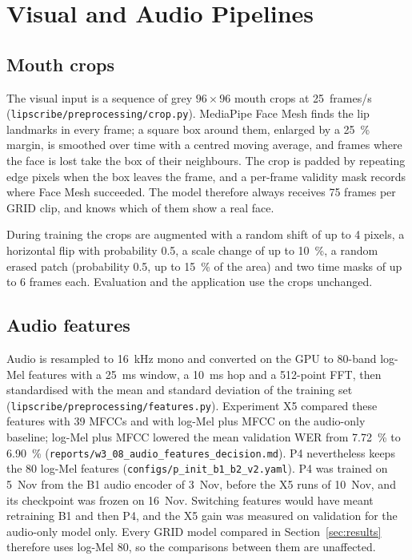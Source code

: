 \section{Visual and Audio Pipelines}
\label{sec:pipelines}

\subsection{Mouth crops}
The visual input is a sequence of grey $96 \times 96$ mouth crops at 25~frames/s
(\texttt{lipscribe/\allowbreak{}preprocessing/\allowbreak{}crop.py}). MediaPipe Face Mesh finds the lip landmarks in every
frame; a square box around them, enlarged by a 25~\% margin, is smoothed over time with a
centred moving average, and frames where the face is lost take the box of their neighbours.
The crop is padded by repeating edge pixels when the box leaves the frame, and a per-frame
validity mask records where Face Mesh succeeded. The model therefore always receives 75 frames
per GRID clip, and knows which of them show a real face.

During training the crops are augmented with a random shift of up to 4 pixels, a horizontal
flip with probability 0.5, a scale change of up to 10~\%, a random erased patch (probability
0.5, up to 15~\% of the area) and two time masks of up to 6 frames each. Evaluation and the
application use the crops unchanged.

\subsection{Audio features}
Audio is resampled to 16~kHz mono and converted on the GPU to 80-band log-Mel features with a
25~ms window, a 10~ms hop and a 512-point FFT, then standardised with the mean and standard
deviation of the training set (\texttt{lipscribe/\allowbreak{}preprocessing/\allowbreak{}features.py}). Experiment X5
compared these features with 39 MFCCs and with log-Mel plus MFCC on the audio-only baseline;
log-Mel plus MFCC lowered the mean validation WER from 7.72~\% to 6.90~\%
(\texttt{reports/\allowbreak{}w3\_\allowbreak{}08\_\allowbreak{}audio\_\allowbreak{}features\_\allowbreak{}decision.md}).
P4 nevertheless keeps the 80 log-Mel features (\texttt{configs/\allowbreak{}p\_\allowbreak{}init\_\allowbreak{}b1\_\allowbreak{}b2\_\allowbreak{}v2.yaml}). P4 was
trained on 5~Nov from the B1 audio encoder of 3~Nov, before the X5 runs of 10~Nov, and its
checkpoint was frozen on 16~Nov. Switching features would have meant retraining B1 and then P4, and
the X5 gain was measured on validation for the audio-only model only. Every GRID model compared in
Section~\ref{sec:results} therefore uses log-Mel 80, so the comparisons between them are unaffected.


